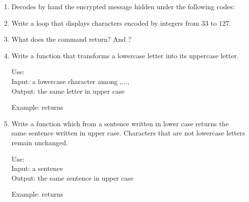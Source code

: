 \documentclass[11pt,class=report,crop=false]{standalone}
\begin{document}

\begin{activite}



\begin{enumerate}
  \item Decodes by hand the encrypted message hidden under the following codes: 

      
  \item Write a loop that displays characters encoded by integers from $33$ to $127$.
  
  \item What does the command   return? And ?
  
  \item Write a function  that transforms a lowercase letter into its uppercase letter.
  
  \begin{fonction}
  
   Use: \\
   Input: a lowercase character among ,...,\\
   Output: the same letter in upper case
  
  \medskip
     
   Example:  returns 
  \end{fonction} 
  
    \item Write a function  which from a sentence written in lower case returns the same sentence written in upper case. Characters that are not lowercase letters remain unchanged.
  
  \begin{fonction}[\ci{uppercase()}]
   Use: \\
   Input: a sentence\\
   Output: the same sentence in upper case
  
  \medskip
     
   Example:  returns 
  \end{fonction} 
   

\end{enumerate}
\end{activite}
\end{document}
